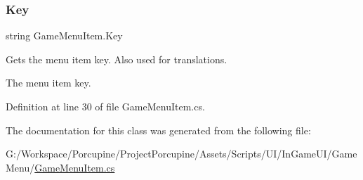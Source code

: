\subsubsection{\texorpdfstring{Key}{Key}}
{\footnotesize\ttfamily string Game\+Menu\+Item.\+Key\hspace{0.3cm}{\ttfamily [get]}}



Gets the menu item key. Also used for translations. 

The menu item key.

Definition at line 30 of file Game\+Menu\+Item.\+cs.



The documentation for this class was generated from the following file\+:\begin{DoxyCompactItemize}
\item 
G\+:/\+Workspace/\+Porcupine/\+Project\+Porcupine/\+Assets/\+Scripts/\+U\+I/\+In\+Game\+U\+I/\+Game\+Menu/\hyperlink{_game_menu_item_8cs}{Game\+Menu\+Item.\+cs}\end{DoxyCompactItemize}

